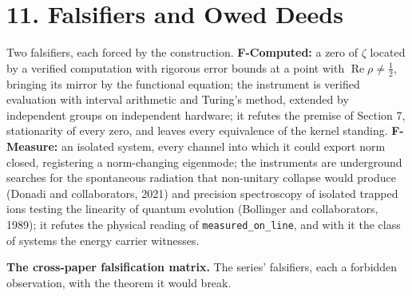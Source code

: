 \documentclass[10pt]{article}
\begin{document}
\hypertarget{falsifiers-and-owed-deeds}{%
\section{11. Falsifiers and Owed
Deeds}\label{falsifiers-and-owed-deeds}}

Two falsifiers, each forced by the construction. \textbf{F-Computed:} a
zero of \(\zeta\) located by a verified computation with rigorous error
bounds at a point with \(\operatorname{Re}\rho\neq\tfrac12\), bringing
its mirror by the functional equation; the instrument is verified
evaluation with interval arithmetic and Turing's method, extended by
independent groups on independent hardware; it refutes the premise of
Section 7, stationarity of every zero, and leaves every equivalence of
the kernel standing. \textbf{F-Measure:} an isolated system, every
channel into which it could export norm closed, registering a
norm-changing eigenmode; the instruments are underground searches for
the spontaneous radiation that non-unitary collapse would produce
(Donadi and collaborators, 2021) and precision spectroscopy of isolated
trapped ions testing the linearity of quantum evolution (Bollinger and
collaborators, 1989); it refutes the physical reading of
\texttt{measured\_on\_line}, and with it the class of systems the energy
carrier witnesses.

\textbf{The cross-paper falsification matrix.} The series' falsifiers,
each a forbidden observation, with the theorem it would break.

\begingroup\small
\end{document}
